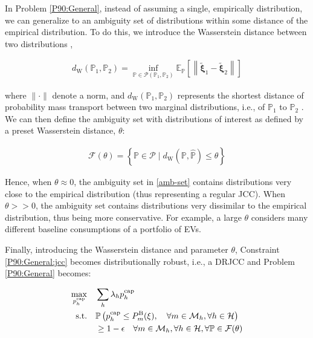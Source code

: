 \documentclass[conference]{IEEEtran}
\begin{document}
In Problem  \eqref{P90:General}, instead of assuming a single, empirically distribution, we can generalize to an ambiguity set of distributions within some distance of the empirical distribution. To do this, we introduce the Wasserstein distance between two distributions \cite{chen2022data},

\begin{align}\label{was}
    d_{\mathrm{W}}\left(\mathbb{P}_1, \mathbb{P}_2\right)=\inf _{\mathbb{P} \in \mathcal{P}\left(\mathbb{P}_1, \mathbb{P}_2\right)} \mathbb{E}_{\mathbb{P}}\left[\left\|\tilde{\boldsymbol{\xi}}_1-\tilde{\boldsymbol{\xi}}_2\right\|\right]
\end{align}

where $\|\cdot\|$ denote a norm, and $d_{\mathrm{W}}\left(\mathbb{P}_1, \mathbb{P}_2\right)$ represents the shortest distance of probability mass transport between two marginal distributions, i.e., of $\mathbb{P}_1$ to $\mathbb{P}_2$ \cite{mohajerin2018data}. We can then define the ambiguity set with distributions of interest as defined by a preset Wasserstein distance, $\theta$:

\begin{align}\label{amb-set}
    \mathcal{F}(\theta)=\left\{\mathbb{P} \in \mathcal{P} \mid d_{\mathrm{W}}(\mathbb{P}, \hat{\mathbb{P}}) \leq \theta\right\}
\end{align}

Hence, when $\theta \approx 0$, the ambiguity set in \eqref{amb-set} contains distributions very close to the empirical distribution (thus representing a regular \ac{JCC}). When $\theta >> 0$, the ambiguity set contains distributions very dissimilar to the empirical distribution, thus being more conservative. For example, a large $\theta$ considers many different baseline consumptions of a portfolio of \acp{EV}.

Finally, introducing the Wasserstein distance and parameter $\theta$, Constraint \eqref{P90:General:jcc} becomes distributionally robust, i.e., a \ac{DRJCC} and Problem \eqref{P90:General} becomes:

\begin{subequations}\label{P90:General:DRJCC}
    \begin{align}
        \max_{p_{h}^{\text{cap}}} \quad & \sum_h \lambda_h p_{h}^{\text{cap}}                                                                                                                                                                                                     \\
        \text{s.t.} \quad               & \mathbb{P}  \left( p_{h}^{\text{cap}} \leq P_{m}^{\text{B}}(\xi), \quad \forall{m} \in \mathcal{M}_{h},  \forall{h} \in \mathcal{H}  \right) \notag  \\
        & \geq 1 - \epsilon \quad \forall{m} \in \mathcal{M}_{h},  \forall{h} \in \mathcal{H}, \forall{\mathbb{P}} \in \mathcal{F}(\theta) \label{P90:General:drjcc_c}
    \end{align}
\end{subequations}
\end{document}
